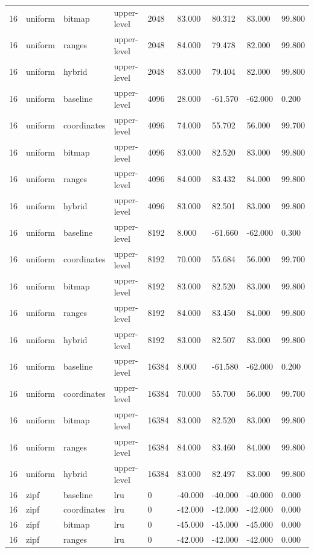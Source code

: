 \begin{tabular}{lllllllll}
16 & uniform & bitmap & upper-level & 2048 & 83.000 & 80.312 & 83.000 & 99.800 \\
16 & uniform & ranges & upper-level & 2048 & 84.000 & 79.478 & 82.000 & 99.800 \\
16 & uniform & hybrid & upper-level & 2048 & 83.000 & 79.404 & 82.000 & 99.800 \\
16 & uniform & baseline & upper-level & 4096 & 28.000 & -61.570 & -62.000 & 0.200 \\
16 & uniform & coordinates & upper-level & 4096 & 74.000 & 55.702 & 56.000 & 99.700 \\
16 & uniform & bitmap & upper-level & 4096 & 83.000 & 82.520 & 83.000 & 99.800 \\
16 & uniform & ranges & upper-level & 4096 & 84.000 & 83.432 & 84.000 & 99.800 \\
16 & uniform & hybrid & upper-level & 4096 & 83.000 & 82.501 & 83.000 & 99.800 \\
16 & uniform & baseline & upper-level & 8192 & 8.000 & -61.660 & -62.000 & 0.300 \\
16 & uniform & coordinates & upper-level & 8192 & 70.000 & 55.684 & 56.000 & 99.700 \\
16 & uniform & bitmap & upper-level & 8192 & 83.000 & 82.520 & 83.000 & 99.800 \\
16 & uniform & ranges & upper-level & 8192 & 84.000 & 83.450 & 84.000 & 99.800 \\
16 & uniform & hybrid & upper-level & 8192 & 83.000 & 82.507 & 83.000 & 99.800 \\
16 & uniform & baseline & upper-level & 16384 & 8.000 & -61.580 & -62.000 & 0.200 \\
16 & uniform & coordinates & upper-level & 16384 & 70.000 & 55.700 & 56.000 & 99.700 \\
16 & uniform & bitmap & upper-level & 16384 & 83.000 & 82.520 & 83.000 & 99.800 \\
16 & uniform & ranges & upper-level & 16384 & 84.000 & 83.460 & 84.000 & 99.800 \\
16 & uniform & hybrid & upper-level & 16384 & 83.000 & 82.497 & 83.000 & 99.800 \\
16 & zipf & baseline & lru & 0 & -40.000 & -40.000 & -40.000 & 0.000 \\
16 & zipf & coordinates & lru & 0 & -42.000 & -42.000 & -42.000 & 0.000 \\
16 & zipf & bitmap & lru & 0 & -45.000 & -45.000 & -45.000 & 0.000 \\
16 & zipf & ranges & lru & 0 & -42.000 & -42.000 & -42.000 & 0.000 \\

\end{tabular}
